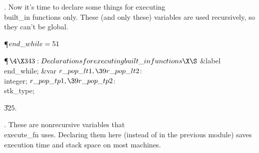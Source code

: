 .
Now it's time to declare some things for executing \\{built\_in}
functions only.  These (and only these) variables are used
recursively, so they can't be global.

\Y\P\D {}$\\{end\_while}=51$\par
\Y\P$\4\X343:Declarations for executing \\{built\_in} functions\X\S$\6
\4\&{label} \\{end\_while}; \6
\4\&{var} $\\{r\_pop\_lt1},\39\\{r\_pop\_lt2}$: \\{integer};\6
$\\{r\_pop\_tp1},\39\\{r\_pop\_tp2}$: \\{stk\_type};\par
\U325.\fi

.
These are nonrecursive variables that \\{execute\_fn} uses.  Declaring
them here (instead of in the previous module) saves execution time and
stack space on most machines.

